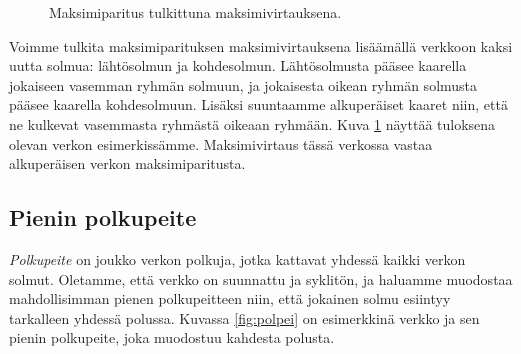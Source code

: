 \begin{figure}
\center
\begin{center}
\end{center}
\caption{Maksimiparitus tulkittuna maksimivirtauksena.}
\label{fig:parver}
\end{figure}

Voimme tulkita maksimiparituksen maksimivirtauksena
lisäämällä verkkoon kaksi uutta solmua: lähtösolmun ja kohdesolmun.
Lähtösolmusta pääsee kaarella jokaiseen vasemman ryhmän solmuun,
ja jokaisesta oikean ryhmän solmusta pääsee kaarella kohdesolmuun.
Lisäksi suuntaamme alkuperäiset kaaret niin,
että ne kulkevat vasemmasta ryhmästä oikeaan ryhmään.
Kuva \ref{fig:parver} näyttää tuloksena olevan verkon
esimerkissämme.
Maksimivirtaus tässä verkossa vastaa alkuperäisen verkon
maksimiparitusta.

\subsection{Pienin polkupeite}


\emph{Polkupeite} on joukko verkon polkuja,
jotka kattavat yhdessä kaikki verkon solmut.
Oletamme, että verkko on suunnattu ja syklitön,
ja haluamme muodostaa mahdollisimman pienen polkupeitteen
niin, että jokainen solmu esiintyy tarkalleen yhdessä polussa.
Kuvassa \ref{fig:polpei} on esimerkkinä verkko ja sen pienin polkupeite,
joka muodostuu kahdesta polusta.

